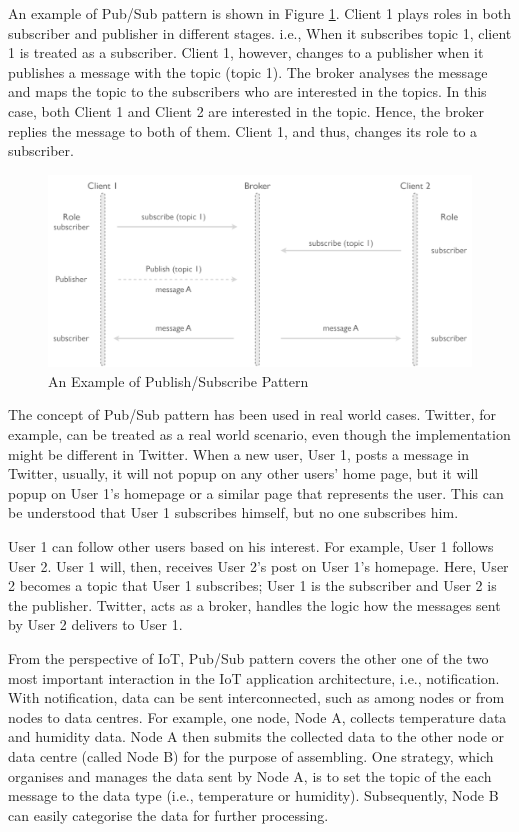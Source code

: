 An example of Pub/Sub pattern is shown in Figure \ref{fig:publish-subscribe-pattern}. Client 1 plays roles in both subscriber and publisher in different stages. i.e., When it subscribes topic 1, client 1 is treated as a subscriber. Client 1, however, changes to a publisher when it publishes a message with the topic (topic 1). The broker analyses the message and maps the topic to the subscribers who are interested in the topics. In this case, both Client 1 and Client 2 are interested in the topic. Hence, the broker replies the message to both of them. Client 1, and thus, changes its role to a subscriber.

\begin{figure}[ht]
  \begin{center}
    \includegraphics[width=1\textwidth]{images/publish-subscribe-pattern.pdf}
    \caption{An Example of Publish/Subscribe Pattern}
    \label{fig:publish-subscribe-pattern}
  \end{center}
\end{figure}

The concept of Pub/Sub pattern has been used in real world cases. Twitter, for example, can be treated as a real world scenario, even though the implementation might be different in Twitter. When a new user, User 1, posts a message in Twitter, usually, it will not popup on any other users' home page, but it will popup on User 1's homepage or a similar page that represents the user. This can be understood that User 1 subscribes himself, but no one subscribes him. 

User 1 can follow other users based on his interest. For example, User 1 follows User 2. User 1 will, then, receives User 2's post on User 1's homepage. Here, User 2 becomes a topic that User 1 subscribes; User 1 is the subscriber and User 2 is the publisher. Twitter, acts as a broker, handles the logic how the messages sent by User 2 delivers to User 1.

From the perspective of IoT, Pub/Sub pattern covers the other one of the two most important interaction in the IoT application architecture, i.e., notification. With notification, data can be sent interconnected, such as among nodes or from nodes to data centres. For example, one node, Node A, collects temperature data and humidity data. Node A then submits the collected data to the other node or data centre (called Node B) for the purpose of assembling. One strategy, which organises and manages the data sent by Node A, is to set the topic of the each message to the data type (i.e., temperature or humidity). Subsequently, Node B can easily categorise the data for further processing.

